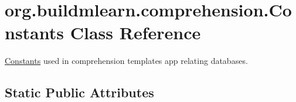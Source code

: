 \hypertarget{classorg_1_1buildmlearn_1_1comprehension_1_1Constants}{}\section{org.\+buildmlearn.\+comprehension.\+Constants Class Reference}
\label{classorg_1_1buildmlearn_1_1comprehension_1_1Constants}


\hyperlink{classorg_1_1buildmlearn_1_1comprehension_1_1Constants}{Constants} used in comprehension template\textquotesingle{}s app relating databases.  


\subsection*{Static Public Attributes}
